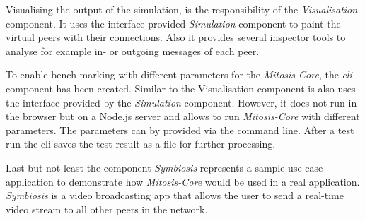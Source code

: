 Visualising the output of the simulation, is the responsibility of the \textit{Visualisation} component. It uses the interface provided \textit{Simulation} component to paint the virtual peers with their connections. Also it provides several inspector tools to analyse for example in- or outgoing messages of each peer.

To enable bench marking with different parameters for the \textit{Mitosis-Core}, the \textit{\gls{cli}} component has been created. Similar to the Visualisation component is also uses the interface provided by the \textit{Simulation} component. However, it does not run in the browser but on a Node.js server and allows to run \textit{Mitosis-Core} with different parameters. The parameters can by provided via the command line. After a test run the \gls{cli} saves the test result as a file for further processing.

Last but not least the component \textit{Symbiosis} represents a sample use case application to demonstrate how \textit{Mitosis-Core} would be used in a real application. \textit{Symbiosis} is a video broadcasting app that allows the user to send a real-time video stream to all other peers in the network.



